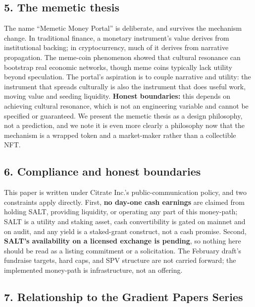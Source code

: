 \subsection{5. The memetic thesis}\label{the-memetic-thesis}

The name ``Memetic Money Portal'' is deliberate, and survives the
mechanism change. In traditional finance, a monetary instrument's value
derives from institutional backing; in cryptocurrency, much of it
derives from narrative propagation. The meme-coin phenomenon showed that
cultural resonance can bootstrap real economic networks, though meme
coins typically lack utility beyond speculation. The portal's aspiration
is to couple narrative and utility: the instrument that spreads
culturally is also the instrument that does useful work, moving value
and seeding liquidity. \textbf{Honest boundaries:} this depends on
achieving cultural resonance, which is not an engineering variable and
cannot be specified or guaranteed. We present the memetic thesis as a
design philosophy, not a prediction, and we note it is even more clearly
a philosophy now that the mechanism is a wrapped token and a
market-maker rather than a collectible NFT.

\subsection{6. Compliance and honest
boundaries}\label{compliance-and-honest-boundaries}

This paper is written under Citrate Inc.'s public-communication policy,
and two constraints apply directly. First, \textbf{no day-one cash
earnings} are claimed from holding SALT, providing liquidity, or
operating any part of this money-path; SALT is a utility and staking
asset, cash convertibility is gated on mainnet and on audit, and any
yield is a staked-grant construct, not a cash promise. Second,
\textbf{SALT's availability on a licensed exchange is pending}, so
nothing here should be read as a listing commitment or a solicitation.
The February draft's fundraise targets, hard caps, and SPV structure are
not carried forward; the implemented money-path is infrastructure, not
an offering.

\subsection{7. Relationship to the Gradient Papers
Series}\label{relationship-to-the-gradient-papers-series}

